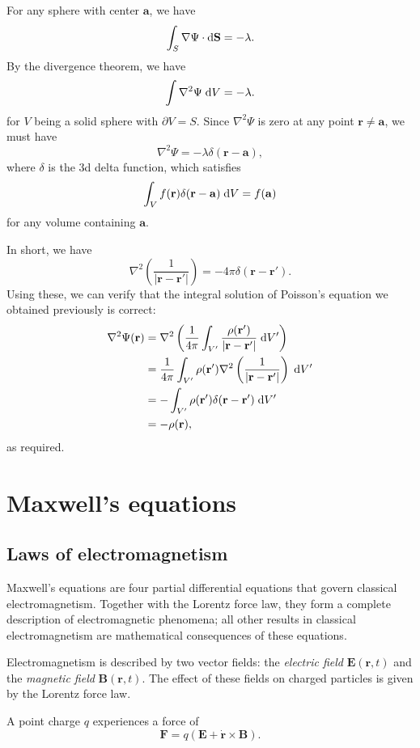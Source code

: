 \documentclass[a4paper]{article}
\begin{document}
For any sphere with center $\mathbf{a}$, we have
\[
  \int_S \nabla \Psi\cdot \mathrm{d} \mathbf{S} = -\lambda.
\]
By the divergence theorem, we have
\[
  \int \nabla^2\Psi \;\mathrm{d} V = -\lambda.
\]
for $V$ being a solid sphere with $\partial V = S$. Since $\nabla^2\Psi$ is zero at any point $\mathbf{r} \not = \mathbf{a}$, we must have
\[
  \nabla^2\Psi = -\lambda \delta(\mathbf{r} - \mathbf{a}),
\]
where $\delta$ is the 3d delta function, which satisfies
\[
  \int_V f(\mathbf{r}) \delta (\mathbf{r} - \mathbf{a})\;\mathrm{d} V = f(\mathbf{a})
\]
for any volume containing $\mathbf{a}$.

In short, we have
\[
  \nabla^2\left(\frac{1}{|\mathbf{r} - \mathbf{r}'|}\right) = -4\pi\delta(\mathbf{r} - \mathbf{r}').
\]
Using these, we can verify that the integral solution of Poisson's equation we obtained previously is correct:
\begin{align*}
  \nabla^2 \Psi(\mathbf{r}) &= \nabla^2\left(\frac{1}{4\pi}\int_{V'}\frac{\rho(\mathbf{r}')}{|\mathbf{r} - \mathbf{r}'|}\;\mathrm{d} V'\right)\\
  &= \frac{1}{4\pi}\int_{V'} \rho(\mathbf{r}')\nabla^2\left(\frac{1}{|\mathbf{r} - \mathbf{r}'|}\right)\;\mathrm{d} V'\\
  &= -\int_{V'} \rho(\mathbf{r}') \delta(\mathbf{r} - \mathbf{r}')\;\mathrm{d} V'\\
  &= -\rho (\mathbf{r}),
\end{align*}
as required.
\section{Maxwell's equations}
\subsection{Laws of electromagnetism}
Maxwell's equations are four partial differential equations that govern classical electromagnetism. Together with the Lorentz force law, they form a complete description of electromagnetic phenomena; all other results in classical electromagnetism are mathematical consequences of these equations.

Electromagnetism is described by two vector fields: the \emph{electric field} $\mathbf{E}(\mathbf{r}, t)$ and the \emph{magnetic field} $\mathbf{B}(\mathbf{r}, t)$. The effect of these fields on charged particles is given by the Lorentz force law.

\begin{law}
  A point charge $q$ experiences a force of
  \[
    \mathbf{F} = q(\mathbf{E} + \dot{\mathbf{r}} \times \mathbf{B}).
  \]
\end{law}
\end{document}
